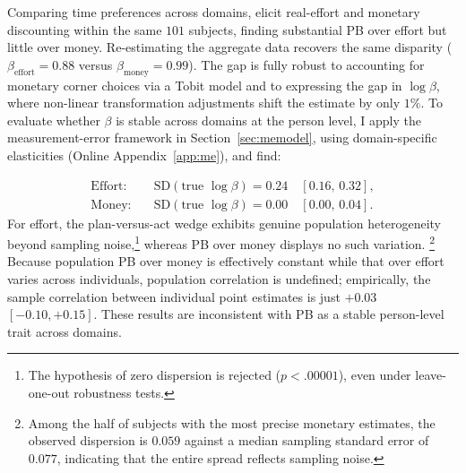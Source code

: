 \documentclass[11pt,a4paper]{article}
\theoremstyle{plain}
\theoremstyle{definition}
\begin{document}
Comparing time preferences across domains, \citet{ans2015} elicit real-effort and monetary discounting within the same $101$ subjects, finding substantial PB over effort but little over money.
Re-estimating the aggregate data recovers the same disparity ($\beta_{\text{effort}} = 0.88$ versus $\beta_{\text{money}} = 0.99$). The gap is fully robust to accounting for monetary corner choices via a %
Tobit model and to expressing the gap in $\log \beta$, where non-linear transformation adjustments shift the estimate by only $1\%$.
To evaluate whether $\beta$ is stable across domains at the person level, I apply the measurement-error framework in Section~\ref{sec:memodel}, using domain-specific elasticities (Online Appendix~\ref{app:me}), and find:

\[
\begin{aligned}
\text{Effort:}\quad & \mathrm{SD}(\text{true }\log\beta) = 0.24 \quad [0.16,\,0.32],\\
\text{Money:}\quad  & \mathrm{SD}(\text{true }\log\beta) = 0.00 \quad [0.00,\,0.04].
\end{aligned}
\]
For effort, the plan-versus-act wedge exhibits genuine population heterogeneity beyond sampling noise,\footnote{%
The hypothesis of zero dispersion is rejected ($p < .00001$), %
even under leave-one-out robustness tests.} 
whereas PB over money displays no such variation.%
\footnote{%
Among the half of subjects with the most precise monetary estimates, the observed dispersion is $0.059$ against a median sampling standard error of $0.077$, indicating that the entire spread reflects sampling noise.} 
Because population PB over money is effectively constant while that over effort varies across individuals, population correlation is undefined; empirically, the sample correlation between individual point estimates is just $+0.03$ $[-0.10, +0.15]$. These results are inconsistent with PB as a stable person-level trait across domains.
\end{document}
